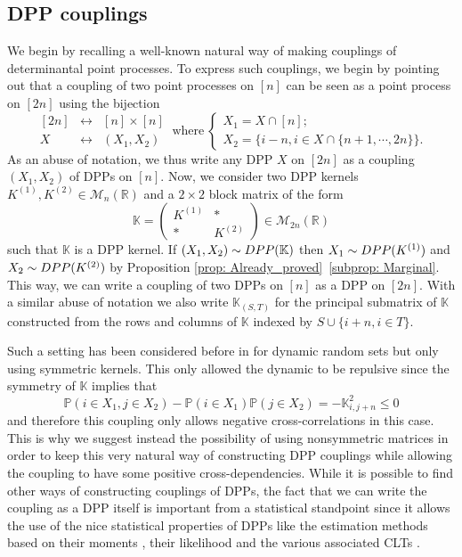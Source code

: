 \documentclass{article}
\numberwithin{equation}{section}
\renewcommand{\leq}{\leqslant}
\newcommand{\bK}{\mathbb{K}}
\newcommand{\bR}{\mathbb{R}}
\newcommand{\DPP}{\textnormal{DPP}}
\theoremstyle{plain}
\begin{document}
\subsection{DPP couplings}\label{subsec: Coupling}

We begin by recalling a well-known natural way of making couplings of determinantal point processes. To express such couplings, we begin by pointing out that a coupling of two point processes on $[n]$ can be seen as a point process on $[2n]$ using the bijection
\[\begin{array}{ccc}
[2n] & \leftrightarrow & [n]\times [n]\\
X & \leftrightarrow & (X_1, X_2)
\end{array}~\mbox{where}~\left\{\begin{array}{l}
X_1 = X\cap [n];\\
X_2 = \big\{i-n, i\in X\cap \{n+1,\cdots, 2n\}\big\}.
\end{array}\right.\]
As an abuse of notation, we thus write any DPP $X$ on $[2n]$ as a coupling $(X_1, X_2)$ of DPPs on $[n]$. Now, we consider two DPP kernels $K^{(1)},K^{(2)}\in\mathcal{M}_n(\bR)$ and a $2\times 2$ block matrix of the form
\begin{equation}\label{eq: DPP_coupling}
\mathbb{K}=\begin{pmatrix} K^{(1)} & * \\
* & K^{(2)}\end{pmatrix}\in\mathcal{M}_{2n}(\bR)
\end{equation}
such that $\mathbb{K}$ is a DPP kernel. If $(X_1, X_2)\sim \DPP(\mathbb{K})$ then $X_1\sim \DPP(K^{(1)})$ and $X_2\sim \DPP(K^{(2)})$ by Proposition \ref{prop: Already_proved}~\ref{subprop: Marginal}. This way, we can write a coupling of two DPPs on $[n]$ as a DPP on $[2n]$. With a similar abuse of notation we also write $\bK_{(S, T)}$ for the principal submatrix of $\bK$ constructed from the rows and columns of $\bK$ indexed by $S\cup\{i+n, i\in T\}$.

\medskip

\noindent Such a setting has been considered before in \cite{Gourieroux} for dynamic random sets but only using symmetric kernels. This only allowed the dynamic to be repulsive since the symmetry of $\bK$ implies that
\[\mathbb{P}(i\in X_1, j\in X_2) - \mathbb{P}(i\in X_1)\mathbb{P}(j\in X_2) = -\mathbb{K}_{i, j+n}^2\leq 0\]
and therefore this coupling only allows negative cross-correlations in this case. This is why we suggest instead the possibility of using nonsymmetric matrices in order to keep this very natural way of constructing DPP couplings while allowing the coupling to have some positive cross-dependencies. While it is possible to find other ways of constructing couplings of DPPs, the fact that we can write the coupling as a DPP itself is important from a statistical standpoint since it allows the use of the nice statistical properties of DPPs like the estimation methods based on their moments \cite{Lavancier, Lavancier21}, their likelihood \cite{Poinas, Gartrell} and the various associated CLTs \cite{Biscio, Poinas17, Brunel}.
\end{document}
